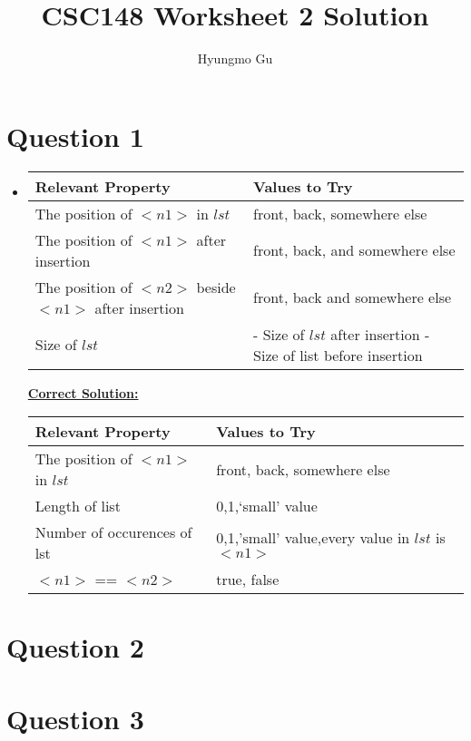 \documentclass[12pt]{article}
\begin{document}
\title{CSC148 Worksheet 2 Solution}
\author{Hyungmo Gu}
\maketitle

\section*{Question 1}
\begin{itemize}
    \item

    \begin{tabular}{|p{8cm}|p{6cm}|}
        \hline
        Relevant Property & Values to Try\\
        \hline
        The position of $<n1>$ in $lst$ & front, back, somewhere else\\
        \hline
        The position of $<n1>$ after insertion & front, back, and somewhere else\\
        \hline
        The position of $<n2>$ beside $<n1>$ after insertion & front, back and somewhere else\\
        \hline
        Size of $lst$ & - Size of $lst$ after insertion \newline - Size of list before insertion\\
        \hline
    \end{tabular}

    \bigskip

    \begin{mdframed}
        \underline{\textbf{Correct Solution:}}

        \bigskip

        \begin{tabular}{|p{8cm}|p{5.8cm}|}
            \hline
            Relevant Property & Values to Try\\
            \hline
            The position of $<n1>$ in $lst$ & front, back, somewhere else\\
            \hline
            \color{red}Length of list\color{black} & \color{red}0,1,`small' value\color{black}\\
            \hline
            \color{red}Number of occurences of lst\color{black} & \color{red}0,1,'small' value,every value in $lst$ is $<n1>$\color{black}\\
            \hline
            \color{red}$<n1>$ == $<n2>$ & \color{red}true, false\color{black}\\
            \hline
        \end{tabular}
    \end{mdframed}
\end{itemize}

\section*{Question 2}

\section*{Question 3}
\end{document}
